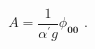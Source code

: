 \begin{equation}  \label{tachyon-vacuum}
A=\frac{1}{{\alpha^{\prime}} g}\phi_{\mathbf{00}}\,\,.
\end{equation}

